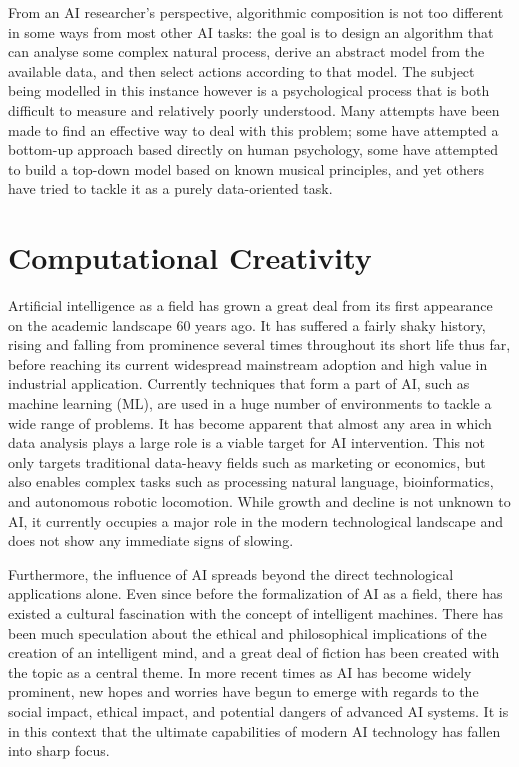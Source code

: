 \documentclass[ author={Stephen Livermore-Tozer},
				supervisor={Dr. Peter Flach},
				degree={MEng},
				title={Algorithmic Co-composition Using Machine Learning},
				subtitle={},
				type={research},
				year={2016} ]{dissertation}
\begin{document}
	From an AI researcher's perspective, algorithmic composition is not too different in some ways from most other AI tasks: the goal is to design an algorithm that can analyse some complex natural process, derive an abstract model from the available data, and then select actions according to that model. The subject being modelled in this instance however is a psychological process that is both difficult to measure and relatively poorly understood. Many attempts have been made to find an effective way to deal with this problem; some have attempted a bottom-up approach based directly on human psychology, some have attempted to build a top-down model based on known musical principles, and yet others have tried to tackle it as a purely data-oriented task.

	\section{Computational Creativity}
	
	Artificial intelligence as a field has grown a great deal from its first appearance on the academic landscape 60 years ago. It has suffered a fairly shaky history, rising and falling from prominence several times throughout its short life thus far, before reaching its current widespread mainstream adoption and high value in industrial application. Currently techniques that form a part of AI, such as machine learning (ML), are used in a huge number of environments to tackle a wide range of problems. It has become apparent that almost any area in which data analysis plays a large role is a viable target for AI intervention. This not only targets traditional data-heavy fields such as marketing or economics, but also enables complex tasks such as processing natural language, bioinformatics, and autonomous robotic locomotion. While growth and decline is not unknown to AI, it currently occupies a major role in the modern technological landscape and does not show any immediate signs of slowing.
	
	Furthermore, the influence of AI spreads beyond the direct technological applications alone. Even since before the formalization of AI as a field, there has existed a cultural fascination with the concept of intelligent machines. There has been much speculation about the ethical and philosophical implications of the creation of an intelligent mind, and a great deal of fiction has been created with the topic as a central theme. In more recent times as AI has become widely prominent, new hopes and worries have begun to emerge with regards to the social impact, ethical impact, and potential dangers of advanced AI systems. It is in this context that the ultimate capabilities of modern AI technology has fallen into sharp focus.
	
\end{document}
